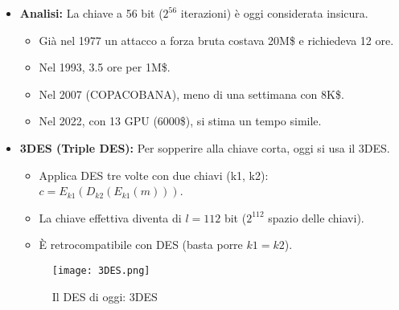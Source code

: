 \documentclass[../main.tex]{subfiles}
\begin{document}
\begin{itemize}
	\item \textbf{Analisi:} La chiave a 56 bit ($2^{56}$ iterazioni) è oggi considerata insicura.
	      \begin{itemize}
	      	\item Già nel 1977 un attacco a forza bruta costava 20M\$ e richiedeva 12 ore.
	      	\item Nel 1993, 3.5 ore per 1M\$.
	      	\item Nel 2007 (COPACOBANA), meno di una settimana con 8K\$.
	      	\item Nel 2022, con 13 GPU (6000\$), si stima un tempo simile.
	      \end{itemize}
	\item \textbf{3DES (Triple DES):} Per sopperire alla chiave corta, oggi si usa il 3DES.
	      \begin{itemize}
	      	\item Applica DES tre volte con due chiavi (k1, k2): $c = E_{k1}(D_{k2}(E_{k1}(m)))$.
	      	\item La chiave effettiva diventa di $l=112$ bit ($2^{112}$ spazio delle chiavi).
	      	\item È retrocompatibile con DES (basta porre $k1=k2$).
	      \end{itemize}
	                
	      \begin{figure}[H]
	      	\centering
	      	\texttt{[image: 3DES.png]}
	      	\caption{Il DES di oggi: 3DES}
	      	\label{fig:etichetta}
	      \end{figure}
	          
\end{itemize}
\end{document}
